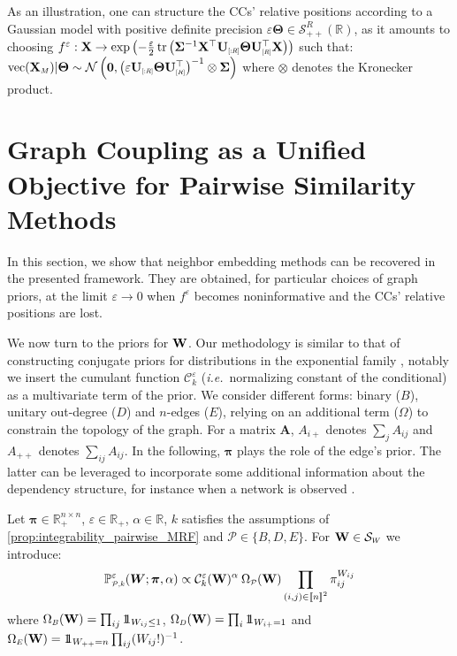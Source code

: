 As an illustration, one can structure the CCs' relative positions according to a Gaussian model with positive definite precision $\varepsilon \bm{\Theta} \in \mathcal{S}_{++}^R(\mathbb{R})$, as it amounts to choosing $f^{\varepsilon} : \Xb \to \exp \left(-\frac{\varepsilon}{2} \operatorname{tr}\left(\bm{\Sigma}^{-1}\Xb^\top\Ub_{\scaleto{[:R]}{5pt}}  \bm{\Theta}\Ub^\top_{\scaleto{[R]}{5pt}} \Xb\right)\right)$ such that: $\mathrm{vec}(\Xb_{\scaleto{M}{4pt}}) | \bm{\Theta} \sim \mathcal{N}\left(\bm{0}, \left(\varepsilon \Ub_{\scaleto{[:R]}{5pt}}  \bm{\Theta}\Ub^\top_{\scaleto{[R]}{5pt}}\right)^{-1} \otimes \bm{\Sigma}\right)$ where $\otimes$ denotes the Kronecker product.

\section{Graph Coupling as a Unified Objective for Pairwise Similarity Methods}\label{sec:GC_unified}

In this section, we show that neighbor embedding methods can be recovered in the presented framework. They are obtained, for particular choices of graph priors, at the limit $\varepsilon \to 0$ when $f^{\varepsilon}$ becomes noninformative and the CCs' relative positions are lost. 

We now turn to the priors for $\mathbf{W}$. Our methodology is similar to that of constructing conjugate priors for distributions in the exponential family \cite{wainwright2008graphical}, notably we insert the cumulant function $\mathcal{C}_k^{\varepsilon}$ (\textit{i.e.}\ normalizing constant of the conditional) as a multivariate term of the prior. 
We consider different forms: binary ($B$), unitary out-degree ($D$) and $n$-edges ($E$), relying on an additional term ($\Omega$) to constrain the topology of the graph. For a matrix $\bm{A}$, $A_{i+}$ denotes $\sum_j A_{ij}$ and $A_{++}$ denotes $\sum_{ij} A_{ij}$. In the following, $\bm{\pi}$ plays the role of the edge's prior. The latter can be leveraged to incorporate some additional information about the dependency structure, for instance when a network is observed \cite{li2020high}. 

\begin{definition}\label{def:prior_W}
Let $\bm{\pi} \in \mathbb{R}_+^{n \times n}$, $\varepsilon \in \mathbb{R}_+$, $\alpha \in \mathbb{R}$, $k$ satisfies the assumptions of \cref{prop:integrability_pairwise_MRF} and $\mathcal{P} \in \{B,D,E\}$. For $\Wb \in \mathcal{S}_{\scaleto{W}{4pt}}$ we introduce:
$$\mathbb{P}_{\scaleto{\mathcal{P},k}{5pt}}^{\varepsilon}(\bm{W}; \bm{\pi}, \alpha) \propto \mathcal{C}^{\varepsilon}_k(\Wb)^{\alpha} \: \Omega_{\scaleto{\mathcal{P}}{4pt}}(\Wb) \prod_{(i,j) \in \integ{n}^2} \pi_{ij}^{W_{ij}}$$
where $\Omega_{\scaleto{B}{4pt}}(\Wb) = \prod_{ij} \ind_{W_{ij} \leq 1}$, $\Omega_{\scaleto{D}{4pt}}(\Wb) = \prod_{i} \ind_{W_{i+} = 1}$ and $\Omega_{\scaleto{E}{4pt}}(\Wb) = \ind_{W_{++} = n}\prod_{ij}(W_{ij}!)^{-1}$.
\end{definition}

